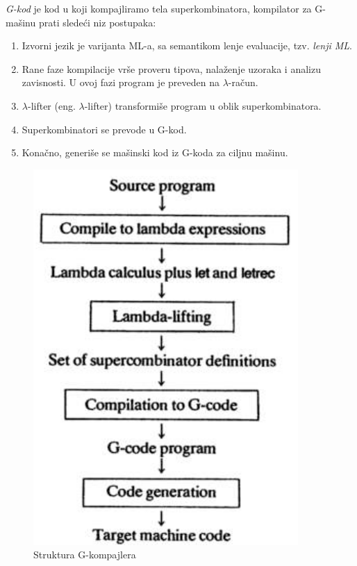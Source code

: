 {\em G-kod} je kod u koji kompajliramo tela superkombinatora, kompilator za G-mašinu prati sledeći niz postupaka:
\begin{enumerate}
\item Izvorni jezik je varijanta ML-a, sa semantikom lenje evaluacije, tzv. {\em lenji ML}.
\item Rane faze kompilacije vrše proveru tipova, nalaženje uzoraka i analizu zavisnosti. U ovoj fazi program je preveden na $\lambda$-račun.
\item $\lambda$-lifter (eng. $\lambda$-lifter) transformiše program u oblik superkombinatora.   
\item Superkombinatori se prevode u G-kod.
\item Konačno, generiše se mašinski kod iz G-koda za ciljnu mašinu.
\end{enumerate}
\begin{figure}[h!]
\begin{center}
\includegraphics[scale=0.4]{gkomp.png}
\end{center}
\caption{Struktura G-kompajlera}
\label{fig:gcompiler}
\end{figure}

